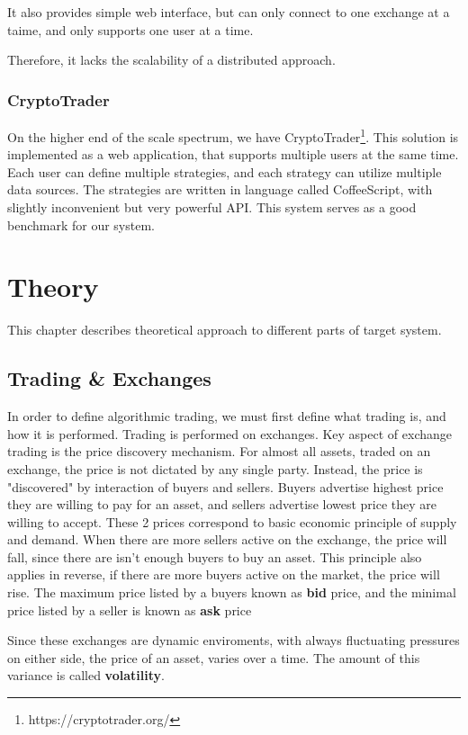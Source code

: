 It also provides simple web interface, but can only connect to one exchange at a taime, and only supports one user at a time.

Therefore, it lacks the scalability of a distributed approach.

\subsection{CryptoTrader}
On the higher end of the scale spectrum, we have CryptoTrader\footnote{https://cryptotrader.org/}. This solution
is implemented as a web application, that supports multiple users at the same time. Each user can define multiple
strategies, and each strategy can utilize multiple data sources. The strategies are written in language called
CoffeeScript, with slightly inconvenient but very powerful API. This system serves as a good benchmark for
our system.


\chapter{Theory}
\label{chapter:theory}
This chapter describes theoretical approach to different parts of target system.
\section{Trading \& Exchanges}
In order to define algorithmic trading, we must first define what trading is, and how it is performed.
Trading is performed on exchanges. Key aspect of exchange trading is the price discovery mechanism. For almost all assets,
traded on an exchange, the price is not dictated by any single party. Instead, the price is "discovered" by interaction of
buyers and sellers. Buyers advertise highest price they are willing to pay for an asset, and sellers advertise lowest price
they are willing to accept. These 2 prices correspond to basic economic principle of supply and demand. When there are more sellers active
on the exchange, the price will fall, since there are isn't enough buyers to buy an asset. This principle also applies in reverse, if there are more
buyers active on the market, the price will rise.
The maximum price listed by a buyers known as \textbf{bid} price, and the minimal price listed by a seller is known as \textbf{ask} price

Since these exchanges are dynamic enviroments, with always fluctuating pressures on either side, the price of an asset, varies over a time.
The amount of this variance is called \textbf{volatility}.

